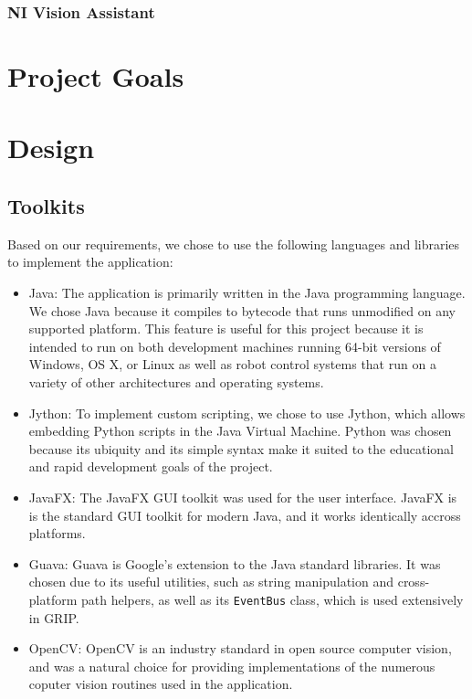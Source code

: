 \documentclass[12pt]{article}
\begin{document}
\subsubsection{NI Vision Assistant}


\section{Project Goals}


\section{Design}

\subsection{Toolkits}
Based on our requirements, we chose to use the following languages and libraries to implement the application:
\begin{itemize}
    \item Java: The application is primarily written in the Java programming language.  We chose Java because it compiles to bytecode that runs unmodified on any supported platform.  This feature is useful for this project because it is intended to run on both development machines running 64-bit versions of Windows, OS X, or Linux as well as robot control systems that run on a variety of other architectures and operating systems.
    \item Jython: To implement custom scripting, we chose to use Jython, which allows embedding Python scripts in the Java Virtual Machine.  Python was chosen because its ubiquity and its simple syntax make it suited to the educational and rapid development goals of the project.
    \item JavaFX: The JavaFX GUI toolkit was used for the user interface.  JavaFX is is the standard GUI toolkit for modern Java, and it works identically accross platforms.
    \item Guava: Guava is Google's extension to the Java standard libraries. It was chosen due to its useful utilities, such as string manipulation and cross-platform path helpers, as well as its \texttt{EventBus} class, which is used extensively in GRIP.
    \item OpenCV: OpenCV is an industry standard in open source computer vision, and was a natural choice for providing implementations of the numerous coputer vision routines used in the application.
\end{itemize}
\end{document}

